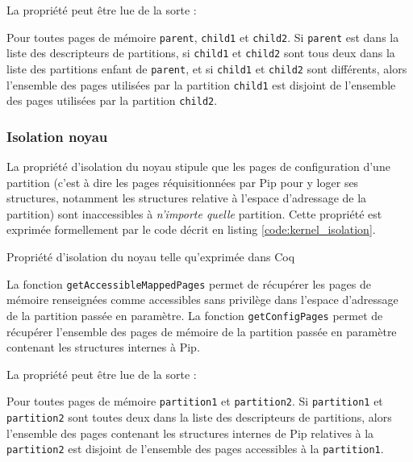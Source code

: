 			La propriété peut être lue de la sorte :
			\begin{theorem}
				Pour toutes pages de mémoire \texttt{parent}, \texttt{child1} et \texttt{child2}. Si \texttt{parent} est dans la liste des descripteurs de partitions, si \texttt{child1} et \texttt{child2} sont tous deux dans la liste des partitions enfant de \texttt{parent}, et si \texttt{child1} et \texttt{child2} sont différents, alors l'ensemble des pages utilisées par la partition \texttt{child1} est disjoint de l'ensemble des pages utilisées par la partition \texttt{child2}.
			\end{theorem}

			\subsubsection{Isolation noyau}
			\label{sec:kernel_isolation}

			La propriété d'isolation du noyau stipule que les pages de configuration d'une partition (c'est à dire les pages réquisitionnées par Pip pour y loger ses structures, notamment les structures relative à l'espace d'adressage de la partition) sont inaccessibles à \emph{n'importe quelle} partition.
			Cette propriété est exprimée formellement par le code décrit en listing \ref{code:kernel_isolation}.

			\begin{listing}[!ht]
				\caption{Propriété d'isolation du noyau telle qu'exprimée dans Coq}
				\label{code:kernel_isolation}
			\end{listing}

			La fonction \texttt{getAccessibleMappedPages} permet de récupérer les pages de mémoire renseignées comme accessibles sans privilège dans l'espace d'adressage de la partition passée en paramètre. La fonction \texttt{getConfigPages} permet de récupérer l'ensemble des pages de mémoire de la partition passée en paramètre contenant les structures internes à Pip.

			La propriété peut être lue de la sorte :
			\begin{theorem}
				Pour toutes pages de mémoire \texttt{partition1} et \texttt{partition2}. Si \texttt{partition1} et \texttt{partition2} sont toutes deux dans la liste des descripteurs de partitions, alors l'ensemble des pages contenant les structures internes de Pip relatives à la \texttt{partition2} est disjoint de l'ensemble des pages accessibles à la \texttt{partition1}.
			\end{theorem}

